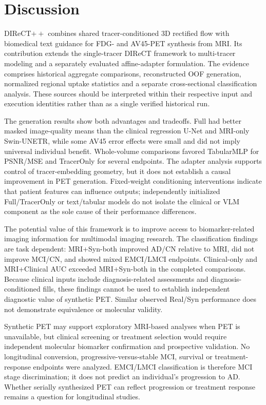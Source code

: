 \section{Discussion}
DIReCT$++$ combines shared tracer-conditioned 3D rectified flow with biomedical text guidance for FDG- and AV45-PET synthesis from MRI. Its contribution extends the single-tracer DIReCT framework to multi-tracer modeling and a separately evaluated affine-adapter formulation. The evidence comprises historical aggregate comparisons, reconstructed OOF generation, normalized regional uptake statistics and a separate cross-sectional classification analysis. These sources should be interpreted within their respective input and execution identities rather than as a single verified historical run.

The generation results show both advantages and tradeoffs. Full had better masked image-quality means than the clinical regression U-Net and MRI-only Swin-UNETR, while some AV45 error effects were small and did not imply universal individual benefit. Whole-volume comparisons favored TabularMLP for PSNR/MSE and TracerOnly for several endpoints. The adapter analysis supports control of tracer-embedding geometry, but it does not establish a causal improvement in PET generation. Fixed-weight conditioning interventions indicate that patient features can influence outputs; independently initialized Full/TracerOnly or text/tabular models do not isolate the clinical or VLM component as the sole cause of their performance differences.

The potential value of this framework is to improve access to biomarker-related imaging information for multimodal imaging research. The classification findings are task dependent: MRI+Syn-both improved AD/CN relative to MRI, did not improve MCI/CN, and showed mixed EMCI/LMCI endpoints. Clinical-only and MRI+Clinical AUC exceeded MRI+Syn-both in the completed comparisons. Because clinical inputs include diagnosis-related assessments and diagnosis-conditioned fills, these findings cannot be used to establish independent diagnostic value of synthetic PET. Similar observed Real/Syn performance does not demonstrate equivalence or molecular validity.

Synthetic PET may support exploratory MRI-based analyses when PET is unavailable, but clinical screening or treatment selection would require independent molecular biomarker confirmation and prospective validation. No longitudinal conversion, progressive-versus-stable MCI, survival or treatment-response endpoints were analyzed. EMCI/LMCI classification is therefore MCI stage discrimination; it does not predict an individual's progression to AD. Whether serially synthesized PET can reflect progression or treatment response remains a question for longitudinal studies.

